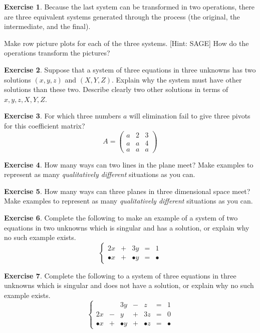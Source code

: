 \documentclass[11pt]{amsart}
\theoremstyle{definition}
\newtheorem{exercise}{Exercise}
\begin{document}
\begin{exercise}
Because the last system can be transformed in two operations, there are three equivalent systems generated through the process (the original, the intermediate, and the final).

Make row picture plots for each of the three systems. [Hint: SAGE] How do the operations transform the pictures?
\end{exercise}


\begin{exercise}
Suppose that a system of three equations in three unknowns has two solutions $(x,y,z)$ and $(X,Y,Z)$. Explain why the system must have other solutions than these two. Describe clearly two other solutions in terms of $x,y,z,X,Y,Z$.
\end{exercise}


\begin{exercise}
For which three numbers $a$ will elimination fail to give three pivots for this coefficient matrix?
\[
A = \begin{pmatrix}
a & 2 & 3 \\ a & a & 4 \\ a & a & a
\end{pmatrix}
\]
\end{exercise}



\begin{exercise}
How many ways can two lines in the plane meet? Make examples to represent as many \emph{qualitatively different} situations as you can.
\end{exercise}


\begin{exercise}
How many ways can three planes in three dimensional space meet? Make examples to represent as many \emph{qualitatively different} situations as you can.
\end{exercise}


\begin{exercise}
Complete the following to make an example of a system of two equations in two unknowns which is singular and has a solution, or explain why no such example exists.
\[
\left\{
\begin{array}{ccccc}
2x & + & 3y & = & 1 \\
\bullet x & + & \bullet y & = & \bullet
\end{array}
\right.
\]
\end{exercise}


\begin{exercise}
Complete the following to a system of three equations in three unknowns which is singular and does not have a solution, or explain why no such example exists.
\[
\left\{
\begin{array}{ccccccc}
   &  & 3y & - & z & = & 1 \\
2x & - & y & + & 3z & = & 0 \\
\bullet x & + & \bullet y & + &\bullet z &  = & \bullet
\end{array}
\right.
\]
\end{exercise}
\end{document}
